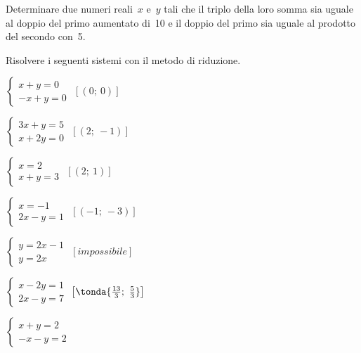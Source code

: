 \begin{esercizio}
 \label{ese:22.15}
Determinare due numeri reali~\(x\) e~\(y\) tali che il
triplo della loro somma sia uguale al doppio del primo aumentato di~10
e il doppio del primo sia uguale al prodotto del secondo con~5.
 \end{esercizio}


 \begin{esercizio}[*]
 \label{ese:22.20}
Risolvere i seguenti sistemi con il metodo di riduzione.

\begin{htmulticols}{2}
 \begin{enumeratea}
 \item \(\left\{\begin{array}{l}x+y=0\\-x+y=0\end{array}\right.\)
 \hfill \(\left[(0;~0)\right]\)
\item \(\left\{\begin{array}{l}3x+y=5\\x+2y=0\end{array}\right.\)
 \hfill \(\left[(2;~-1)\right]\)
\item \(\left\{\begin{array}{l}x=2\\x+y=3\end{array}\right.\)
 \hfill \(\left[(2;~1)\right]\)
\item \(\left\{\begin{array}{l}x=-1\\2x-y=1\end{array}\right.\)
 \hfill \(\left[(-1;~-3)\right]\)
 \item \(\left\{\begin{array}{l}y=2x-1\\y=2x\end{array}\right.\)
 \hfill \(\left[impossibile\right]\)
\item \(\left\{\begin{array}{l}x-2y=1\\2x-y=7\end{array}\right.\)
 \hfill \(\left[\tonda{\frac{13}{3};~\frac{5}{3}}\right]\)
\item \(\left\{\begin{array}{l}x+y=2\\-x-y=2\end{array}\right.\)

\end{enumeratea}
\end{htmulticols}
\end{esercizio}
